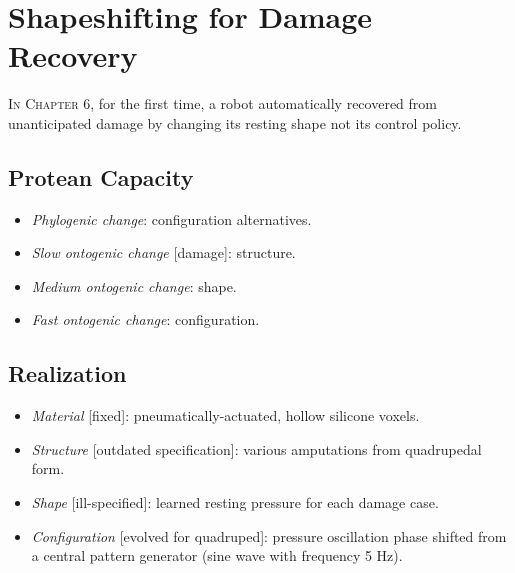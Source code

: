 



\section{Shapeshifting for Damage Recovery}


\textsc{In Chapter 6,}
for the first time, a robot automatically recovered from unanticipated damage by changing its resting shape not its control policy.

\subsection{Protean Capacity}

\begin{itemize}
    \item \textit{Phylogenic change}: configuration alternatives.
    \item \textit{Slow ontogenic change} [damage]: structure.
    \item \textit{Medium ontogenic change}: shape.
    \item \textit{Fast ontogenic change}: configuration.
\end{itemize}


\subsection{Realization}

\begin{itemize}
    \item \textit{Material} [fixed]: pneumatically-actuated, hollow silicone voxels.
    \item \textit{Structure} [outdated specification]: various amputations from quadrupedal form.
    \item \textit{Shape} [ill-specified]: learned resting pressure for each damage case.
    \item \textit{Configuration} [evolved for quadruped]: pressure oscillation phase shifted from a central pattern generator (sine wave with frequency 5 Hz).
\end{itemize}

